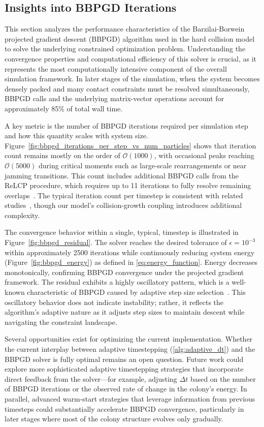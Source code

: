 \documentclass[conference]{IEEEtran}
\begin{document}
\subsection{Insights into BBPGD Iterations}

This section analyzes the performance characteristics of the Barzilai-Borwein projected gradient descent (BBPGD) algorithm used in the hard collision model to solve the underlying constrained optimization problem. Understanding the convergence properties and computational efficiency of this solver is crucial, as it represents the most computationally intensive component of the overall simulation framework. In later stages of the simulation, when the system becomes densely packed and many contact constraints must be resolved simultaneously, BBPGD calls and the underlying matrix-vector operations account for approximately 85\% of total wall time.

A key metric is the number of BBPGD iterations required per simulation step and how this quantity scales with system size. Figure~\ref{fig:bbpgd_iterations_per_step_vs_num_particles} shows that iteration count remains mostly on the order of $\mathcal{O}(1000)$, with occasional peaks reaching $\mathcal{O}(5000)$ during critical moments such as large-scale rearrangements or near jamming transitions. This count includes additional BBPGD calls from the ReLCP procedure, which requires up to 11 iterations to fully resolve remaining overlaps~\cite{Weady2024SM}. The typical iteration count per timestep is consistent with related studies~\cite{Yan2019}, though our model's collision-growth coupling introduces additional complexity.

The convergence behavior within a single, typical, timestep is illustrated in Figure~\ref{fig:bbpgd_residual}. The solver reaches the desired tolerance of $\epsilon = 10^{-3}$ within approximately 2500 iterations while continuously reducing system energy (Figure~\ref{fig:bbpgd_energy}) as defined in \autoref{eq:energy_function}. Energy decreases monotonically, confirming BBPGD convergence under the projected gradient framework. The residual exhibits a highly oscillatory pattern, which is a well-known characteristic of BBPGD caused by adaptive step size selection~\cite{BBPGD,Schneider2021}. This oscillatory behavior does not indicate instability; rather, it reflects the algorithm's adaptive nature as it adjusts step sizes to maintain descent while navigating the constraint landscape.

Several opportunities exist for optimizing the current implementation. Whether the current interplay between adaptive timestepping (\autoref{alg:adaptive_dt}) and the BBPGD solver is fully optimal remains an open question. Future work could explore more sophisticated adaptive timestepping strategies that incorporate direct feedback from the solver—for example, adjusting $\Delta t$ based on the number of BBPGD iterations or the observed rate of change in the colony’s energy. In parallel, advanced warm-start strategies that leverage information from previous timesteps could substantially accelerate BBPGD convergence, particularly in later stages where most of the colony structure evolves only gradually.
\end{document}

